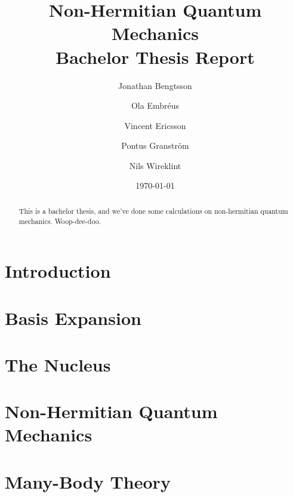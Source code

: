 \documentclass[12pt,a4paper]{report}
\begin{document}
  

\listoftodos

\title{Non-Hermitian Quantum Mechanics\\ 
\Large Bachelor Thesis Report}
\author{Jonathan Bengtsson  \and Ola Embréus \and Vincent Ericsson \and Pontus Granström \and Nils Wireklint}
\date{\today}



\maketitle

\newpage
\begin{abstract}
This is a bachelor thesis, and we've done some calculations on non-hermitian quantum mechanics. Woop-dee-doo.
\end{abstract}
\newpage

\tableofcontents


\newpage

\setcounter{page}{1}

\chapter{Introduction}
\label{cha:introduction}



\chapter{Basis Expansion}
\label{cha:basis expansion}


\chapter{The  Nucleus}
\label{cha:he5}


\chapter{Non-Hermitian Quantum Mechanics} 
\label{cha:nhqm}



\chapter{Many-Body Theory}
\label{cha:many-body}


\end{document}
